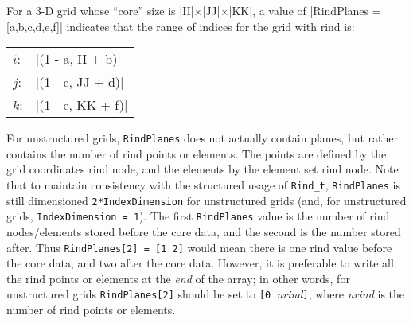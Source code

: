 For a 3-D grid whose ``core'' size is |II|$\times$|JJ|$\times$|KK|, a value of 
|RindPlanes = [a,b,c,d,e,f]| indicates that the range of indices for the grid 
with rind is:
\begin{center}
\begin{tabular}{ll}
  $i$: & |(1 - a, II + b)| \\
  $j$: & |(1 - c, JJ + d)| \\
  $k$: & |(1 - e, KK + f)|
\end{tabular}
\end{center}

For unstructured grids, \texttt{RindPlanes} does not actually contain
planes, but rather contains the number of rind points or elements.
The points are defined by the grid coordinates rind node, and the
elements by the element set rind node.
Note that to maintain consistency with the structured usage
of \texttt{Rind\_t}, \texttt{RindPlanes} is still dimensioned
\texttt{2*IndexDimension} for unstructured grids (and, for unstructured
grids, \texttt{IndexDimension = 1}).
The first \texttt{RindPlanes} value is the number of rind nodes/elements
stored before the core data, and the second is the number stored after.
Thus \texttt{RindPlanes[2] = [1 2]} would mean there is one rind value
before the core data, and two after the core data.
However, it is preferable to write all the rind points or elements at
the \emph{end} of the array; in other words, for unstructured grids
\texttt{RindPlanes[2]} should be set to \texttt{[0 }\textit{nrind}\texttt{]},
where \textit{nrind} is the number of rind points or elements.
